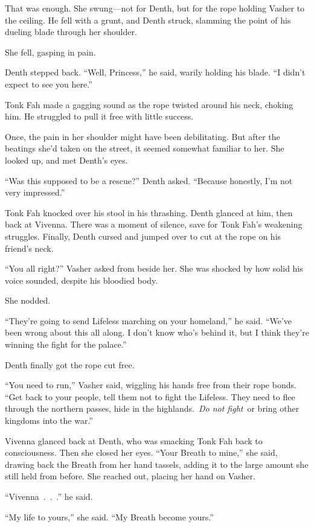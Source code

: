 That was enough. She swung—not for Denth, but for the rope holding Vasher to the ceiling. He fell with a grunt, and Denth struck, slamming the point of his dueling blade through her shoulder.

She fell, gasping in pain.

Denth stepped back. “Well, Princess,” he said, warily holding his blade. “I didn’t expect to see you here.”

Tonk Fah made a gagging sound as the rope twisted around his neck, choking him. He struggled to pull it free with little success.

Once, the pain in her shoulder might have been debilitating. But after the beatings she’d taken on the street, it seemed somewhat familiar to her. She looked up, and met Denth’s eyes.

“Was this supposed to be a rescue?” Denth asked. “Because honestly, I’m not very impressed.”

Tonk Fah knocked over his stool in his thrashing. Denth glanced at him, then back at Vivenna. There was a moment of silence, save for Tonk Fah’s weakening struggles. Finally, Denth cursed and jumped over to cut at the rope on his friend’s neck.

“You all right?” Vasher asked from beside her. She was shocked by how solid his voice sounded, despite his bloodied body.

She nodded.

“They’re going to send Lifeless marching on your homeland,” he said. “We’ve been wrong about this all along. I don’t know who’s behind it, but I think they’re winning the fight for the palace.”

Denth finally got the rope cut free.

“You need to run,” Vasher said, wiggling his hands free from their rope bonds. “Get back to your people, tell them not to fight the Lifeless. They need to flee through the northern passes, hide in the highlands.~\textit{Do not fight}~or bring other kingdoms into the war.”

Vivenna glanced back at Denth, who was smacking Tonk Fah back to consciousness. Then she closed her eyes. “Your Breath to mine,” she said, drawing back the Breath from her hand tassels, adding it to the large amount she still held from before. She reached out, placing her hand on Vasher.

“Vivenna~.~.~.” he said.

“My life to yours,” she said. “My Breath become yours.”

